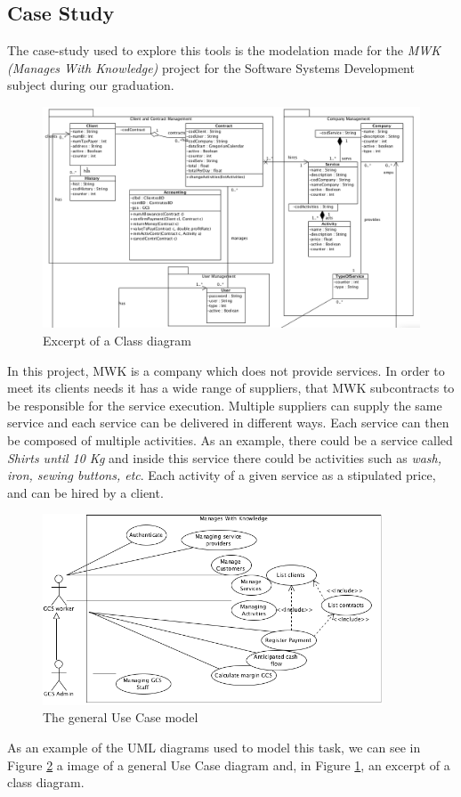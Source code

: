\subsection*{Case Study}
The case-study used to explore this tools is the modelation made for the \textit{MWK (Manages With Knowledge)} project for the Software Systems Development subject during our graduation.

\begin{figure}[!htbp]
\begin{center}
\includegraphics[scale=0.345]{images/classbw.png}
\caption{Excerpt of a Class diagram}\label{fig:class}
\end{center}
\end{figure} 

\newpage
In this project, MWK is a company which does not provide services. 
In order to meet its clients needs it has a wide range of suppliers, that MWK subcontracts to be responsible for the service execution.
Multiple suppliers can supply the same service and each  service can be delivered in different ways.
Each service can then be composed of multiple activities. As an example, there could be a service called \textit{Shirts until 10 Kg} and inside this service there could be activities such as \textit{wash, iron, sewing buttons, etc}.
Each activity of a given service as a stipulated price, and can be hired by a client.

\begin{figure}[!htbp]
\begin{center}
\includegraphics[width=0.9\textwidth]{images/usecase.png}
\caption{The general Use Case model}\label{fig:usecase}
\end{center}
\end{figure} 

As an example of the UML diagrams used to model this task, we can see in Figure \ref{fig:usecase} a image of a general Use Case diagram and, in Figure \ref{fig:class}, an excerpt of a class diagram.
